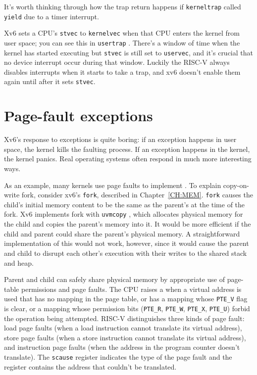 It's worth thinking through how the trap return happens if
{\tt kerneltrap} called {\tt yield} due to a timer interrupt.

Xv6 sets a CPU's {\tt stvec} to {\tt kernelvec} when that CPU
enters the kernel from user space; you can see this in {\tt usertrap}
.
There's a window of time when the kernel has started executing
but {\tt stvec} is still set to {\tt uservec}, and it's crucial that 
no device interrupt occur during that window.
Luckily the RISC-V always disables interrupts when it starts
to take a trap, and xv6 doesn't enable them again until
after it sets {\tt stvec}.

\section{Page-fault exceptions}
\label{sec:pagefaults}

Xv6's response to exceptions is quite boring: if an exception happens
in user space, the kernel kills the faulting process.  If an
exception happens in the kernel, the kernel panics.  Real operating systems
often respond in much more interesting ways.

As an example,
many kernels use page faults to implement
.
To explain copy-on-write fork, consider xv6's \lstinline{fork},
described in Chapter~\ref{CH:MEM}.
\lstinline{fork} causes the child's initial
memory content to be the same as the parent's at the time of the fork.
Xv6 implements fork with
\lstinline{uvmcopy}
,
which allocates physical memory for
the child and copies the parent's memory into it.
It would be more efficient if the child and parent could share 
the parent's physical memory.
A straightforward implementation of this would not work, however,
since it would cause the parent and child to disrupt each other's
execution with their writes to the shared stack and heap.

Parent and child can safely share physical memory by
appropriate use of page-table permissions and page faults.
The CPU raises a
when a virtual address is used that has no mapping
in the page table, or has a mapping whose \lstinline{PTE_V}
flag is clear, or a mapping whose permission bits
(\lstinline{PTE_R},
\lstinline{PTE_W},
\lstinline{PTE_X},
\lstinline{PTE_U})
forbid the operation being attempted.
RISC-V distinguishes three
kinds of page fault: load page faults (when a load instruction cannot
translate its virtual address), store page faults (when a store
instruction cannot translate its virtual address), and instruction
page faults (when the address in the program counter doesn't translate).  The
\lstinline{scause} register indicates the type of the
page fault and the  register contains the address
that couldn't be translated.

